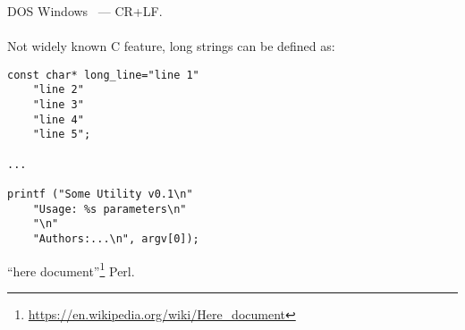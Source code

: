  DOS  Windows ~--- CR+LF.

\paragraph{}
\label{heredoc}
{Not widely known C feature, long strings can be defined as}:

\begin{lstlisting}
const char* long_line="line 1"
	"line 2"
	"line 3"
	"line 4"
	"line 5";

...

printf ("Some Utility v0.1\n"
	"Usage: %s parameters\n"
	"\n"
	"Authors:...\n", argv[0]);
\end{lstlisting}

``here document''\footnote{\url{https://en.wikipedia.org/wiki/Here_document}} 
 \AndENRU Perl.

